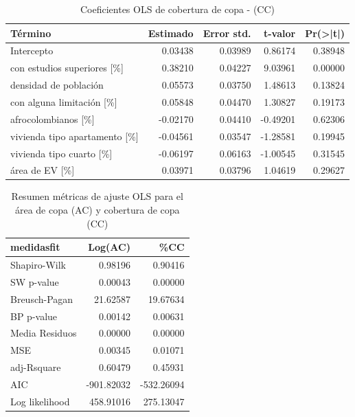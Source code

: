 \documentclass[12pt,a4paper,openany]{book}
\theoremstyle{definition}
\theoremstyle{definition}
\theoremstyle{definition}
\theoremstyle{remark}
\begin{document}
\begin{table}[H]

\caption{\label{tab:coef-lm-cobertura}Coeficientes OLS de cobertura de copa - (CC)}
\centering
\begin{tabular}{lrrrr}
\toprule
Término & Estimado & Error std. & t-valor & Pr(>|t|)\\
\midrule
Intercepto & 0.03438 & 0.03989 & 0.86174 & 0.38948\\
con estudios superiores [\%] & 0.38210 & 0.04227 & 9.03961 & 0.00000\\
densidad de población & 0.05573 & 0.03750 & 1.48613 & 0.13824\\
con alguna limitación [\%] & 0.05848 & 0.04470 & 1.30827 & 0.19173\\
afrocolombianos [\%] & -0.02170 & 0.04410 & -0.49201 & 0.62306\\
\addlinespace
vivienda tipo apartamento [\%] & -0.04561 & 0.03547 & -1.28581 & 0.19945\\
vivienda tipo cuarto [\%] & -0.06197 & 0.06163 & -1.00545 & 0.31545\\
área de EV [\%] & 0.03971 & 0.03796 & 1.04619 & 0.29627\\
\bottomrule
\end{tabular}
\end{table}

\begin{table}[H]

\caption{\label{tab:ajuste-lmcopa-pob-predios}Resumen métricas de ajuste OLS para el área de copa (AC) y cobertura de copa (CC) }
\centering
\begin{tabular}{lrr}
\toprule
medidasfit & Log(AC) & \%CC\\
\midrule
Shapiro-Wilk & 0.98196 & 0.90416\\
SW p-value & 0.00043 & 0.00000\\
Breusch-Pagan & 21.62587 & 19.67634\\
BP p-value & 0.00142 & 0.00631\\
Media Residuos & 0.00000 & 0.00000\\
\addlinespace
MSE & 0.00345 & 0.01071\\
adj-Rsquare & 0.60479 & 0.45931\\
AIC & -901.82032 & -532.26094\\
Log likelihood & 458.91016 & 275.13047\\
\bottomrule
\end{tabular}
\end{table}
\end{document}
